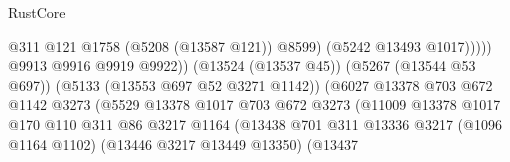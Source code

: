 \begin{lexlean}{RustCore}
\begin{coremodule}
                                                              @311
                                                              @121
                                                              @1758
                                                              (@5208 (@13587 @121))
                                                              @8599)
                                                            (@5242 @13493 @1017)))))
                                                    @9913
                                                    @9916
                                                    @9919
                                                    @9922))
                                                (@13524 (@13537 @45))
                                                (@5267 (@13544 @53 @697))
                                                (@5133 (@13553 @697 @52 @3271 @1142))
                                                (@6027
                                                  @13378
                                                  @703
                                                  @672
                                                  @1142
                                                  @3273
                                                  (@5529
                                                    @13378
                                                    @1017
                                                    @703
                                                    @672
                                                    @3273
                                                    (@11009
                                                      @13378
                                                      @1017
                                                      @170
                                                      @110
                                                      @311
                                                      @86
                                                      @3217
                                                      @1164
                                                      (@13438
                                                        @701
                                                        @311
                                                        @13336
                                                        @3217
                                                        (@1096 @1164 @1102)
                                                        (@13446 @3217 @13449 @13350)
                                                        (@13437

\end{coremodule}
\end{lexlean}

